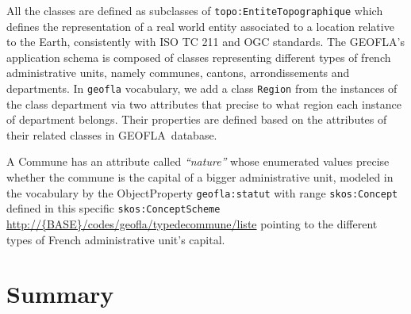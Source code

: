 All the classes are defined as subclasses of  \texttt{topo:EntiteTopographique} which defines the representation of a real world entity associated to a location relative to the Earth, consistently with ISO TC 211 and OGC standards. 
The GEOFLA\circledR 's application schema is composed of classes representing different types of french administrative units, namely communes, cantons, arrondissements and departments. In \texttt{geofla} vocabulary, we add a class \texttt{Region}  from the instances of the class department via two attributes  that precise to what region each instance of department belongs.  Their properties are defined based on the attributes of their related classes in GEOFLA\circledR ~database.

A Commune has an attribute called \textit{``nature''} whose enumerated values precise whether the commune is the capital of a bigger administrative unit, modeled in the vocabulary by the ObjectProperty \texttt{geofla:statut} with range \texttt{skos:Concept} defined in this specific \texttt{skos:ConceptScheme} \url{http://{BASE}/codes/geofla/typedecommune/liste} pointing to the different types of French administrative unit's capital. 


\section{Summary}
\label{sec:summarych1}


